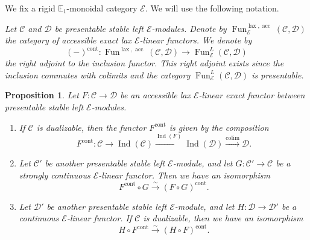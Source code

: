 \documentclass[11pt,leqno]{amsart}
\newtheorem{prop}[theo]{Proposition}
\numberwithin{equation}{section}
\DeclareMathOperator*{\colim}{colim}
\newcommand{\xto}{\xrightarrow}
\newcommand{\lax}{\operatorname{lax}}
\newcommand{\cont}{\operatorname{cont}}
\newcommand{\acc}{\operatorname{acc}}
\newcommand{\bE}{{\mathbb E}}
\newcommand{\cD}{{\mathcal D}}
\newcommand{\cC}{{\mathcal C}}
\newcommand{\cE}{{\mathcal E}}
\newcommand{\Fun}{\operatorname{Fun}}
\newcommand{\Ind}{\operatorname{Ind}}
\begin{document}
We fix a rigid $\bE_1$-monoidal category $\cE.$ We will use the following notation.

{} {\it Let $\cC$ and $\cD$ be presentable stable left $\cE$-modules. Denote by $\Fun^{\lax,\acc}_{\cE}(\cC,\cD)$ the category of accessible exact lax $\cE$-linear functors. We denote by 
\begin{equation*}
(-)^{\cont}:\Fun^{\lax,\acc}(\cC,\cD)\to\Fun^L_{\cE}(\cC,\cD)
\end{equation*}
the right adjoint to the inclusion functor. This right adjoint exists since the inclusion commutes with colimits and the category $\Fun^L_{\cE}(\cC,\cD)$ is presentable.
}

\begin{prop}\label{prop:properties_of_F^cont}
Let $F:\cC\to\cD$ be an accessible lax $\cE$-linear exact functor between presentable stable left $\cE$-modules.
\begin{enumerate}[label=(\roman*), ref=(\roman*)]
\item If $\cC$ is dualizable, then the functor $F^{\cont}$ is given by the composition
\begin{equation}\label{eq:description_of_F^cont}
F^{\cont}:\cC\to\Ind(\cC)\xto{\Ind(F)}\Ind(\cD)\xto{\colim}\cD. 
\end{equation} \label{description_of_F^cont}
\item Let $\cC'$ be another presentable stable left $\cE$-module, and let $G:\cC'\to\cC$ be a strongly continuous $\cE$-linear functor. Then we have an isomorphism \begin{equation*}
F^{\cont}\circ G\xto{\sim} (F\circ G)^{\cont}.
\end{equation*} \label{precomposing_with_strcont}
\item Let $\cD'$ be another presentable stable left $\cE$-module, and let $H:\cD\to\cD'$ be a continuous $\cE$-linear functor. If $\cC$ is dualizable, then we have an isomorphism
\begin{equation*}
H\circ F^{\cont}\xto{\sim} (H\circ F)^{\cont}.
\end{equation*} \label{composing_with_cont}
\end{enumerate}
\end{prop}
\end{document}
